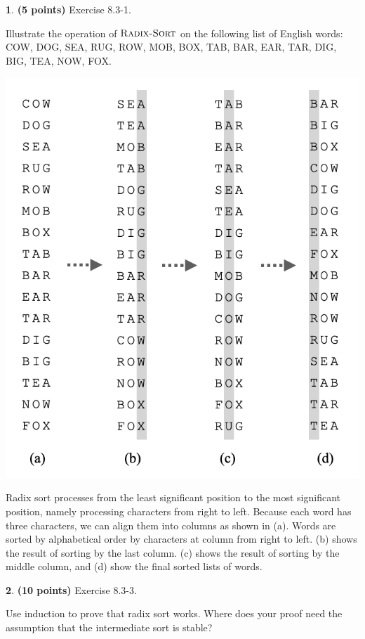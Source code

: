 \documentclass[11pt]{article}
\theoremstyle{definition}
\theoremstyle{theorem}
\newtheorem{prob}{}
\newcommand{\solution}{\medskip\noindent{\color{DarkBlue}\textbf{Solution:}}}
\begin{document}
\newpage
\begin{prob} \textbf{(5 points)} Exercise 8.3-1.
\end{prob}
Illustrate the operation of $\textproc{\textsc{Radix-Sort}}$ on the following list of English words: COW, DOG, SEA, RUG, ROW, MOB, BOX, TAB, BAR, EAR, TAR, DIG, BIG, TEA, NOW, FOX.

\solution

\includegraphics[scale=0.8]{hw3q5.png}

Radix sort processes from the least significant position to the most significant position, namely processing characters from right to left. Because each word has three characters, we can align them into columns as shown in (a). Words are sorted by alphabetical order by characters at column from right to left. (b) shows the result of sorting by the last column. (c) shows the result of sorting by the middle column, and (d) show the final sorted lists of words.


\newpage
\begin{prob} \textbf{(10 points)} Exercise 8.3-3.
\end{prob}
Use induction to prove that radix sort works. Where does your proof need the assumption that the intermediate sort is stable?
\end{document}
